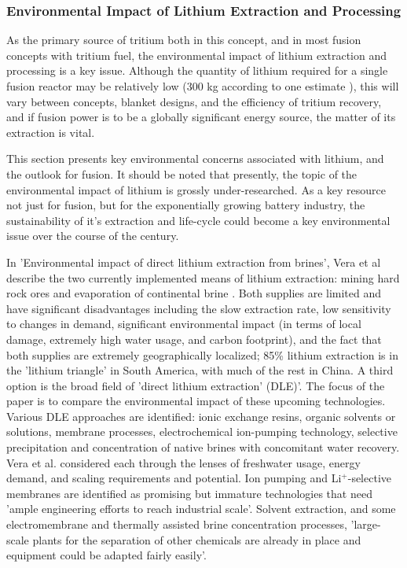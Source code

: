 \subsubsection{Environmental Impact of Lithium Extraction and Processing}

As the primary source of tritium both in this concept, and in most fusion concepts with tritium fuel, the environmental impact of lithium extraction and processing is a key issue. Although the quantity of lithium required for a single fusion reactor may be relatively low (300 kg according to one estimate \cite{rytov1992environmental}), this will vary between concepts, blanket designs, and the efficiency of tritium recovery, and if fusion power is to be a globally significant energy source, the matter of its extraction is vital. 

This section presents key environmental concerns associated with lithium, and the outlook for fusion. It should be noted that presently, the topic of the environmental impact of lithium is grossly under-researched. As a key resource not just for fusion, but for the exponentially growing battery industry, the sustainability of it's extraction and life-cycle could become a key environmental issue over the course of the century. 

In 'Environmental impact of direct lithium extraction from brines', Vera et al describe the two currently implemented means of lithium extraction: mining hard rock ores and evaporation of continental brine \cite{vera2023environmental}. Both supplies are limited and have significant disadvantages including the slow extraction rate, low sensitivity to changes in demand, significant environmental impact (in terms of local damage, extremely high water usage, and carbon footprint), and the fact that both supplies are extremely geographically localized; 85\% lithium extraction is in the 'lithium triangle' in South America, with much of the rest in China. A third option is the broad field of 'direct lithium extraction' (DLE)'. The focus of the paper is to compare the environmental impact of these upcoming technologies. Various DLE approaches are identified: ionic exchange resins, organic solvents or solutions, membrane processes, electrochemical ion-pumping technology, selective precipitation and concentration of native brines with concomitant water recovery. Vera et al. considered each through the lenses of freshwater usage, energy demand, and scaling requirements and potential. Ion pumping and Li$^+$-selective membranes are identified as promising but immature technologies that need 'ample engineering efforts to reach industrial scale'. Solvent extraction, and some electromembrane and thermally assisted brine concentration processes,  'large-scale plants for the separation of other chemicals are already in place and equipment could be adapted fairly easily'.

